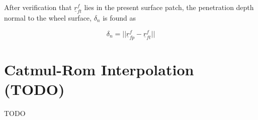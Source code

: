 \documentclass[
10pt, %
a4paper, %
oneside, %
headinclude,footinclude, %
BCOR5mm, %
]{scrartcl}
\begin{document}
After verification that $\underline{r}_{ft}^f$ lies in the present surface patch, the penetration depth normal to the wheel surface, $\delta_n$ is found as

\begin{equation}
\delta_n = \lvert \lvert \underline{r}_{fp}^f - \underline{r}_{ft}^f \rvert \rvert
\end{equation}


\section{Catmul-Rom Interpolation (TODO)}
TODO

\renewcommand{\refname}{\spacedlowsmallcaps{References}} %




\end{document}
